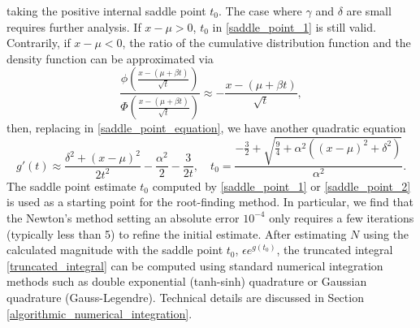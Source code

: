\documentclass[10pt,a4paper,oneside]{article}
\numberwithin{equation}{section}
\begin{document}
taking the positive internal saddle point $t_0$. The case where $\gamma$ and $\delta$ are small requires further analysis. If $x-\mu > 0$, $t_0$ in \eqref{saddle_point_1} is still valid. Contrarily, if $x -\mu < 0$, the ratio of the cumulative distribution function and the density function can be approximated via
\begin{equation*}
\frac{\phi\left(\frac{x - (\mu+ \beta t)}{\sqrt{t}}\right)}{\Phi\left(\frac{x - (\mu + \beta t)}{\sqrt{t}}\right)} \approx -\frac{x - (\mu + \beta t)}{\sqrt{t}},
\end{equation*}
then, replacing in \eqref{saddle_point_equation}, we have another quadratic equation
\begin{equation}\label{saddle_point_2}
g'(t) \approx \frac{\delta^2 + (x-\mu)^2}{2t^2} -\frac{\alpha^2}{2} -\frac{3}{2t}, \quad t_0 = \frac{-\frac{3}{2} + \sqrt{\frac{9}{4} + \alpha^2 \left((x-\mu)^2 + \delta^2\right)}}{\alpha^2}.
\end{equation}
The saddle point estimate $t_0$ computed by \eqref{saddle_point_1} or \eqref{saddle_point_2} is used as a starting point for the root-finding method. In particular, we find that the Newton's method setting an absolute error $10^{-4}$ only requires a few iterations (typically less than 5) to refine the initial estimate. After estimating $N$ using the calculated magnitude with the saddle point $t_0$, $\epsilon e^{g(t_0)}$, the truncated integral \eqref{truncated_integral} can be computed using standard numerical integration methods such as double exponential (tanh-sinh) quadrature or Gaussian quadrature (Gauss-Legendre). Technical details are discussed in Section \ref{algorithmic_numerical_integration}.
\end{document}
